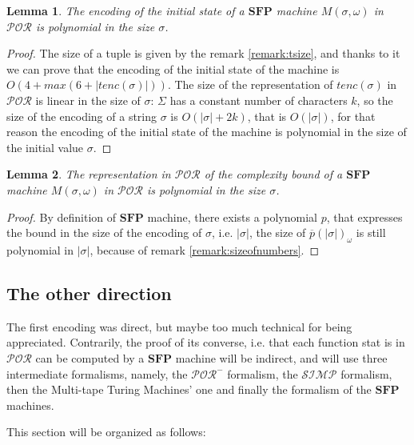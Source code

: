 \documentclass[10pt]{amsart}
\newcommand{\SFP}{\mathbf{SFP}}
\newcommand{\POR}{\mathcal{POR}}
\newcommand{\SIMP}{\mathcal{SIMP}}
\newcommand{\sone}{\sigma}
\newcommand{\oone}{\omega}
\newtheorem{lemma}{Lemma}
\begin{document}
\begin{lemma}
The encoding of the initial state of a $\SFP$ machine $M (\sone, \oone)$ in $\POR$ is polynomial in the size $\sone$.
\end{lemma}

\begin{proof}
The size of a tuple is given by the remark \ref{remark:tsize}, and thanks to it we can prove that the encoding of the initial state of the machine is $O(4+ max(6+|tenc(\sone)|))$. The size of the representation of $tenc(\sone)$ in $\POR$ is linear in the size of $\sone$: $\Sigma$ has a constant number of characters $k$, so the size of the encoding of a string $\sone$ is $O(|\sone|+ 2k)$, that is $O(|\sone|)$, for that reason the encoding of the initial state of the machine is polynomial in the size of the initial value $\sone$.
\end{proof}

\begin{lemma}
The representation in $\POR$ of the complexity bound of a $\SFP$ machine $M (\sone, \oone)$ in $\POR$ is polynomial in the size $\sone$.
\end{lemma}

\begin{proof}
By definition of $\SFP$ machine, there exists a polynomial $p$, that expresses the bound in the size of the encoding of $\sone$, i.e. $|\sone|$, the size of $\overline p(|\sone|)_\oone$ is still polynomial in $|\sone|$, because of remark \ref{remark:sizeofnumbers}.
\end{proof}


\subsection{The other direction}

The first encoding was direct, but maybe too much technical for being appreciated. Contrarily, the proof of its converse, i.e. that each function stat is in $\POR$ can be computed by a $\SFP$ machine will be indirect, and will use three intermediate formalisms, namely, the $\POR^-$ formalism, the $\SIMP$ formalism, then the Multi-tape Turing Machines' one and finally the formalism of the $\SFP$ machines.

This section will be organized as follows:
\end{document}
